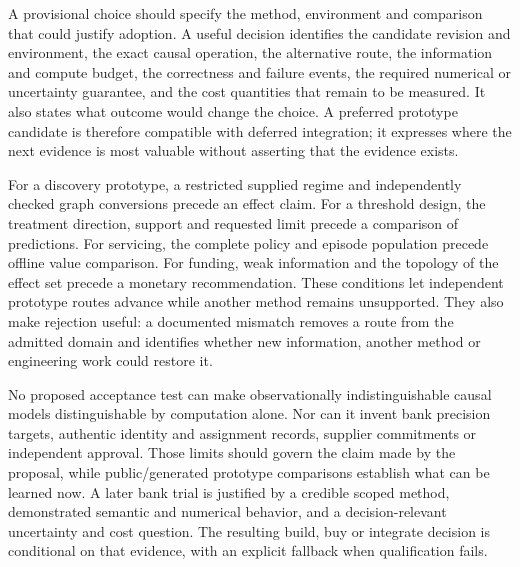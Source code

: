 A provisional choice should specify the method, environment and comparison that could justify adoption. A useful
decision identifies the candidate revision and environment, the exact causal
operation, the alternative route, the information and compute budget, the
correctness and failure events, the required numerical or uncertainty
guarantee, and the cost quantities that remain to be measured. It also states
what outcome would change the choice. A preferred prototype candidate is
therefore compatible with deferred integration; it expresses where the next
evidence is most valuable without asserting that the evidence exists.
\citep{exec16_s10_design}

For a discovery prototype, a restricted supplied regime and independently
checked graph conversions precede an effect claim. For a threshold design,
the treatment direction, support and requested limit precede a comparison of
predictions. For servicing, the complete policy and episode population precede
offline value comparison. For funding, weak information and the topology of
the effect set precede a monetary recommendation. These conditions let
independent prototype routes advance while another method remains unsupported.
They also make rejection useful: a documented mismatch removes a route from
the admitted domain and identifies whether new information, another method or
engineering work could restore it.

No proposed acceptance test can make observationally indistinguishable causal
models distinguishable by computation alone. Nor can it invent bank precision
targets, authentic identity and assignment records, supplier commitments or
independent approval. Those limits should govern the claim made by the
proposal, while public/generated prototype comparisons establish what can be
learned now. A later bank trial is justified by a credible scoped method,
demonstrated semantic and numerical behavior, and a decision-relevant
uncertainty and cost question. The resulting build, buy or integrate decision
is conditional on that evidence, with an explicit fallback when qualification
fails.
\label{exec16:s10-end}

